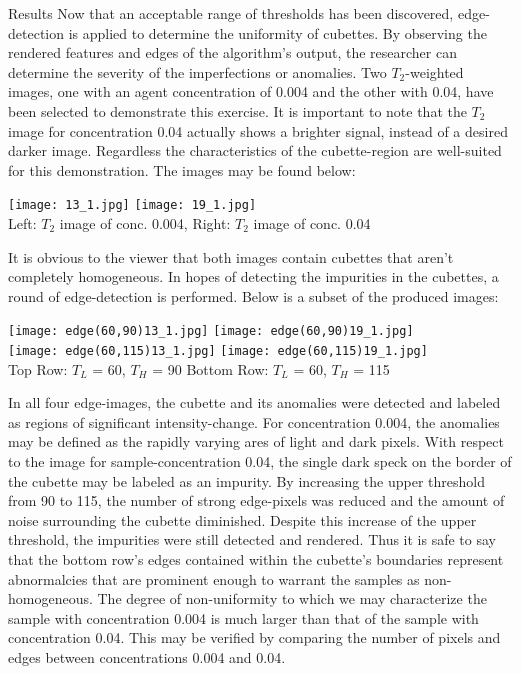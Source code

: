 \documentclass[a4paper,12pt]{article}
\begin{document}
\begin{section}{Results}
Now that an acceptable range of thresholds has been discovered, edge-detection is applied to determine the uniformity of cubettes. By observing the rendered features and edges of the algorithm's output, the researcher can determine the severity of the imperfections or anomalies. Two $T_2$-weighted images, one with an agent concentration of 0.004 and the other with 0.04, have been selected to demonstrate this exercise. It is important to note that the $T_2$ image for concentration 0.04 actually shows a brighter signal, instead of a desired darker image. Regardless the characteristics of the cubette-region are well-suited for this demonstration. The images may be found below:

\begin{center}
\texttt{[image: 13\_1.jpg]}
\texttt{[image: 19\_1.jpg]}\\
\small{Left: $T_2$ image of conc. 0.004, Right: $T_2$ image of conc. 0.04}
\end{center}

It is obvious to the viewer that both images contain cubettes that aren't completely homogeneous. In hopes of detecting the impurities in the cubettes, a round of edge-detection is performed. Below is a subset of the produced images:

\begin{center}
\texttt{[image: edge(60,90)13\_1.jpg]}
\texttt{[image: edge(60,90)19\_1.jpg]}\\
\texttt{[image: edge(60,115)13\_1.jpg]}
\texttt{[image: edge(60,115)19\_1.jpg]}\\
\small{Top Row: $T_L$ = 60, $T_H$ = 90} \hspace{1mm} \small{Bottom Row: $T_L$ = 60, $T_H$ = 115}
\end{center}

In all four edge-images, the cubette and its anomalies were detected and labeled as regions of significant intensity-change. For concentration 0.004, the anomalies may be defined as the rapidly varying ares of light and dark pixels. With respect to the image for sample-concentration 0.04, the single dark speck on the border of the cubette may be labeled as an impurity. By increasing the upper threshold from 90 to 115, the number of strong edge-pixels was reduced and the amount of noise surrounding the cubette diminished. Despite this increase of the upper threshold, the impurities were still detected and rendered. Thus it is safe to say that the bottom row's edges contained within the cubette's boundaries represent abnormalcies that are prominent enough to warrant the samples as non-homogeneous. The degree of non-uniformity to which we may characterize the sample with concentration 0.004 is much larger than that of the sample with concentration 0.04. This may be verified by comparing the number of pixels and edges between concentrations 0.004 and 0.04.


\end{section}
\end{document}
